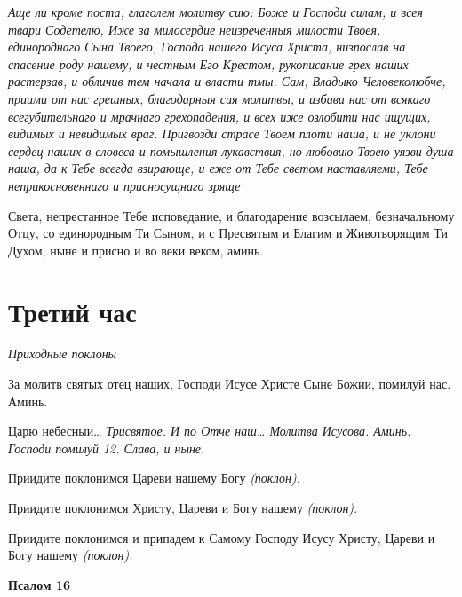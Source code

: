  \itshape Аще ли кроме поста, глаголем молитву сию:\normalfont{} Боже и Господи силам, и
всея твари Содетелю, Иже за милосердие неизреченныя милости Твоея,
единороднаго Сына Твоего, Господа нашего Исуса Христа, низпослав на
спасение роду нашему, и честным Его Крестом, рукописание грех
наших растерзав, и обличив тем начала и власти тмы. Сам, Владыко
Человеколюбче, приими от нас грешных, благодарныя сия молитвы, и избави
нас от всякаго всегубительнаго и мрачнаго грехопадения, и всех иже
озлобити нас ищущих, видимых и невидимых враг. Пригвозди страсе Твоем
плоти наша, и не уклони сердец наших в словеса и помышления лукавствия,
но любовию Твоею уязви душа наша, да к Тебе всегда взирающе, и еже от
Тебе светом наставляеми, Тебе неприкосновеннаго и присносущнаго зряще

Света, непрестанное Тебе исповедание, и благодарение возсылаем,
безначальному Отцу, со единородным Ти Сыном, и с Пресвятым и
Благим и Животворящим Ти Духом, ныне и присно и во веки веком,
аминь.

   


\section{Третий час}



\itshape Приходные поклоны\normalfont{}


   За молитв святых отец наших, Господи Исусе Христе Сыне Божии,
помилуй нас. Аминь.


   Царю небесныи… \itshape Трисвятое\normalfont{}. \itshape И по\normalfont{} Отче наш… \itshape Молитва Исусова\normalfont{}. Аминь.
Господи помилуй \itshape 12\normalfont{}. \itshape Слава, и ныне.\normalfont{}


   Приидите поклонимся Цареви нашему Богу \itshape (поклон)\normalfont{}.


   Приидите поклонимся Христу, Цареви и Богу нашему \itshape (поклон)\normalfont{}.


   Приидите поклонимся и припадем к Самому Господу Исусу Христу,
Цареви и Богу нашему \itshape (поклон)\normalfont{}.



 

\bfseries Псалом 16\normalfont{}


